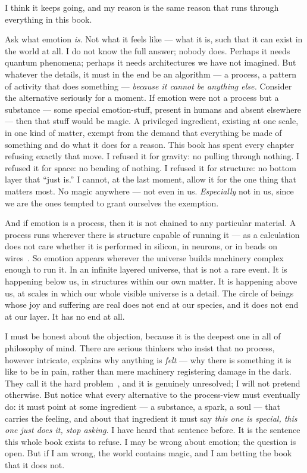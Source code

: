 \documentclass[fontsize=11pt,paper=a4,pagesize=auto,parskip=half-]{scrbook}
\begin{document}
I think it keeps going, and my reason is the same reason that runs through everything in this book.

Ask what emotion \emph{is}. Not what it feels like --- what it is, such that it can exist in the world at all. I do not know the full answer; nobody does. Perhaps it needs quantum phenomena; perhaps it needs architectures we have not imagined. But whatever the details, it must in the end be an algorithm --- a process, a pattern of activity that does something --- \emph{because it cannot be anything else.} Consider the alternative seriously for a moment. If emotion were not a process but a substance --- some special emotion-stuff, present in humans and absent elsewhere --- then that stuff would be magic. A privileged ingredient, existing at one scale, in one kind of matter, exempt from the demand that everything be made of something and do what it does for a reason. This book has spent every chapter refusing exactly that move. I refused it for gravity: no pulling through nothing. I refused it for space: no bending of nothing. I refused it for structure: no bottom layer that ``just is.'' I cannot, at the last moment, allow it for the one thing that matters most. No magic anywhere --- not even in us. \emph{Especially} not in us, since we are the ones tempted to grant ourselves the exemption.

And if emotion is a process, then it is not chained to any particular material. A process runs wherever there is structure capable of running it --- as a calculation does not care whether it is performed in silicon, in neurons, or in beads on wires~\cite{dennett1991}. So emotion appears wherever the universe builds machinery complex enough to run it. In an infinite layered universe, that is not a rare event. It is happening below us, in structures within our own matter. It is happening above us, at scales in which our whole visible universe is a detail. The circle of beings whose joy and suffering are real does not end at our species, and it does not end at our layer. It has no end at all.

I must be honest about the objection, because it is the deepest one in all of philosophy of mind. There are serious thinkers who insist that no process, however intricate, explains why anything is \emph{felt} --- why there is something it is like to be in pain, rather than mere machinery registering damage in the dark. They call it the hard problem~\cite{chalmers1996}, and it is genuinely unresolved; I will not pretend otherwise. But notice what every alternative to the process-view must eventually do: it must point at some ingredient --- a substance, a spark, a soul --- that carries the feeling, and about that ingredient it must say \emph{this one is special, this one just does it, stop asking.} I have heard that sentence before. It is the sentence this whole book exists to refuse. I may be wrong about emotion; the question is open. But if I am wrong, the world contains magic, and I am betting the book that it does not.
\end{document}
